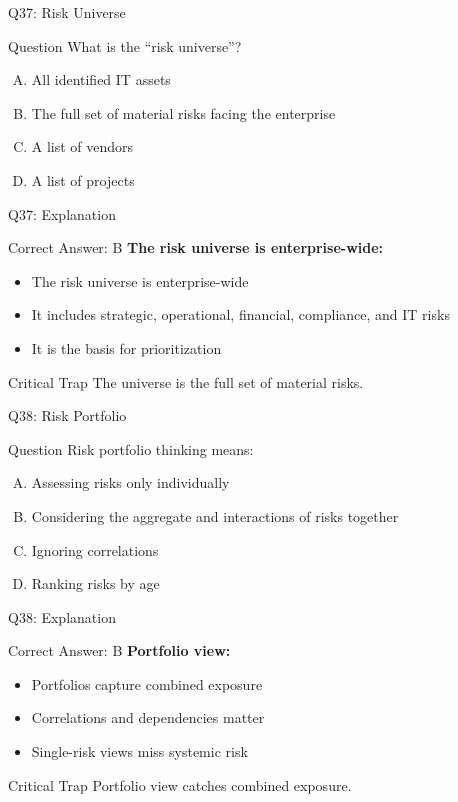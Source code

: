 \documentclass{beamer}
\begin{document}
	\begin{frame}{Q37: Risk Universe}
		\begin{block}{Question}
			What is the ``risk universe''?
		\end{block}
		\begin{enumerate}[(A)]
			\item All identified IT assets
			\item The full set of material risks facing the enterprise
			\item A list of vendors
			\item A list of projects
		\end{enumerate}
	\end{frame}
	
	\begin{frame}{Q37: Explanation}
		\begin{block}{Correct Answer: B}
			\textbf{The risk universe is enterprise-wide:}
			\begin{itemize}
				\item The risk universe is enterprise-wide
				\item It includes strategic, operational, financial, compliance, and IT risks
				\item It is the basis for prioritization
			\end{itemize}
		\end{block}
		\begin{alertblock}{Critical Trap}
			The universe is the full set of material risks.
		\end{alertblock}
	\end{frame}
	
	\begin{frame}{Q38: Risk Portfolio}
		\begin{block}{Question}
			Risk portfolio thinking means:
		\end{block}
		\begin{enumerate}[(A)]
			\item Assessing risks only individually
			\item Considering the aggregate and interactions of risks together
			\item Ignoring correlations
			\item Ranking risks by age
		\end{enumerate}
	\end{frame}
	
	\begin{frame}{Q38: Explanation}
		\begin{block}{Correct Answer: B}
			\textbf{Portfolio view:}
			\begin{itemize}
				\item Portfolios capture combined exposure
				\item Correlations and dependencies matter
				\item Single-risk views miss systemic risk
			\end{itemize}
		\end{block}
		\begin{alertblock}{Critical Trap}
			Portfolio view catches combined exposure.
		\end{alertblock}
	\end{frame}
	
\end{document}
